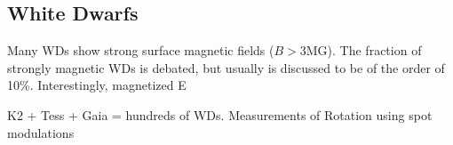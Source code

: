 {\color{red} \subsection{White Dwarfs}}
Many WDs show strong surface magnetic fields ($B>$3MG). The fraction of strongly magnetic WDs is debated, but usually is discussed to be of the order of 10\%. Interestingly, magnetized E 

K2 + Tess + Gaia = hundreds of WDs. Measurements of Rotation using spot modulations